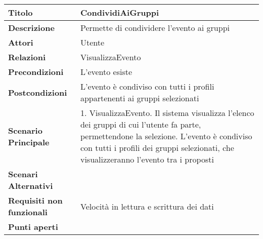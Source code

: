 \begin{tabular} {|P{4.5cm}|P{11cm}|}
  \hline
  \textbf{Titolo}                   & CondividiAiGruppi                                                           \\
  \hline
  \textbf{Descrizione}              & Permette di condividere l'evento ai gruppi                                  \\
  \hline
  \textbf{Attori}                   & Utente                                                                      \\
  \hline
  \textbf{Relazioni}                & VisualizzaEvento                                                            \\
  \hline
  \textbf{Precondizioni}            & L'evento esiste                                                             \\
  \hline
  \textbf{Postcondizioni}           & L'evento è condiviso con tutti i profili appartenenti ai gruppi selezionati \\
  \hline
  \textbf{Scenario Principale}      & 1. VisualizzaEvento. Il sistema visualizza l'elenco dei gruppi di cui l'utente fa parte, permettendone la selezione. L'evento è condiviso con tutti i profili dei gruppi selezionati, che visualizzeranno l'evento tra i proposti \\
  \hline
  \textbf{Scenari Alternativi}      &                                                                             \\
  \hline
  \textbf{Requisiti non funzionali} & Velocità in lettura e scrittura dei dati                                    \\
  \hline
  \textbf{Punti aperti}             &                                                                             \\
  \hline
\end{tabular}
\hfill
\break

